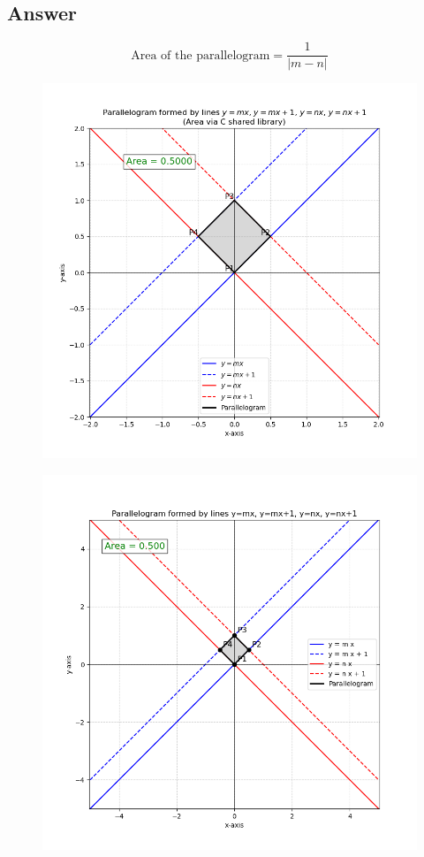 \documentclass[journal]{IEEEtran}
\begin{document}
\subsection*{Answer}
\[
\boxed{\text{Area of the parallelogram} = \frac{1}{|m-n|}}
\]
\begin{figure}[h]
    \centering
    \includegraphics[width=0.9\columnwidth]{figs/Figure_81.png}
    \caption{}
    \label{fig:placeholder}
\end{figure}
\begin{figure}
    \centering
    \includegraphics[width=0.9\columnwidth]{figs/fig82.png}
    \caption{}
    \label{fig:placeholder}
\end{figure}
\end{document}
